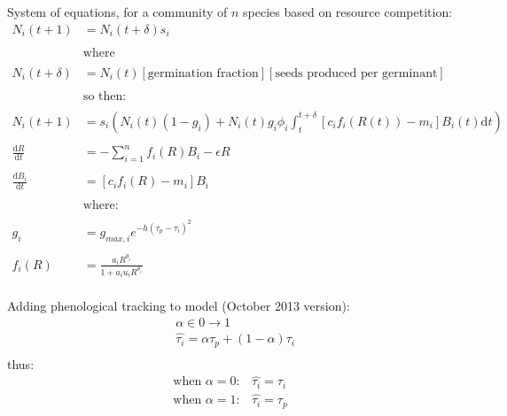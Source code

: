 \documentclass[11pt,a4paper,oneside]{article}
\begin{document}
\newpage
\noindent System of equations, for a community of \(n\) species based
on resource competition:
\begin{align*}
N_{i}(t+1) & = N_{i}(t+\delta)s_{i}
\\
\\
& \text{where}
\\
\\
N_{i}(t+\delta) & = N_{i}(t) [\text{germination fraction}][\text{seeds
  produced per germinant}]
\\
\\
& \text{so then:}
\\
\\
N_{i}(t+1) & =
s_{i}(N_{i}(t)(1-g_{i})+N_{i}(t)g_{i}\phi_{i}\int_t^{t+\delta}[c_{i}f_{i}(R(t))-m_{i}]B_{i}(t)\mathrm{d}t)
\\
\\
\frac{\mathrm{d}R}{\mathrm{d}t} & = - \sum_{i=1}^{n}f_{i}(R)B_{i} -\epsilon R
\\
\\
\frac{\mathrm{d}B_{i}}{\mathrm{d}t} &  = [c_{i}f_{i}(R) - m_{i}]B_{i}
\\
\\
& \text{where:} 
\\
\\
g_{i} & = g_{max,i}e^{-h(\tau_{p}-\tau_{i})^2}
\\
\\
f_{i}(R) & = \frac{a_{i}R^{\theta_{i}}}{1+a_{i}u_{i}R^{\theta_{i}}}
\\
\end{align*}

\noindent Adding phenological tracking to model (October 2013 version): \\
\begin{align*}
& \alpha \in 0 \rightarrow 1
\\
&\hat{\tau_{i}} = \alpha \tau_{p} + (1-\alpha)\tau_{i}\\
\end{align*}
\noindent thus:
\begin{align*}
\text{when } \alpha = 0: & \hat{\tau_{i}}=\tau_{i}
\\
\text{when }  \alpha = 1: & \hat{\tau_{i}}=\tau_{p}
\end{align*}
\end{document}
